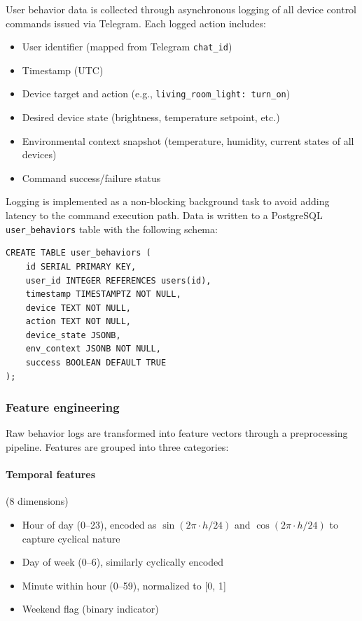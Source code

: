 User behavior data is collected through asynchronous logging of all device control commands issued via Telegram. Each logged action includes:

\begin{itemize}
    \item User identifier (mapped from Telegram \texttt{chat\_id})
    \item Timestamp (UTC)
    \item Device target and action (e.g., \texttt{living\_room\_light: turn\_on})
    \item Desired device state (brightness, temperature setpoint, etc.)
    \item Environmental context snapshot (temperature, humidity, current states of all devices)
    \item Command success/failure status
\end{itemize}

Logging is implemented as a non-blocking background task to avoid adding latency to the command execution path. Data is written to a PostgreSQL \texttt{user\_behaviors} table with the following schema:

\begin{verbatim}
CREATE TABLE user_behaviors (
    id SERIAL PRIMARY KEY,
    user_id INTEGER REFERENCES users(id),
    timestamp TIMESTAMPTZ NOT NULL,
    device TEXT NOT NULL,
    action TEXT NOT NULL,
    device_state JSONB,
    env_context JSONB NOT NULL,
    success BOOLEAN DEFAULT TRUE
);
\end{verbatim}

\subsubsection{Feature engineering}

Raw behavior logs are transformed into feature vectors through a preprocessing pipeline. Features are grouped into three categories:

\paragraph{Temporal features} (8 dimensions)
\begin{itemize}
    \item Hour of day (0--23), encoded as $\sin(2\pi \cdot h / 24)$ and $\cos(2\pi \cdot h / 24)$ to capture cyclical nature
    \item Day of week (0--6), similarly cyclically encoded
    \item Minute within hour (0--59), normalized to [0, 1]
    \item Weekend flag (binary indicator)
\end{itemize}

